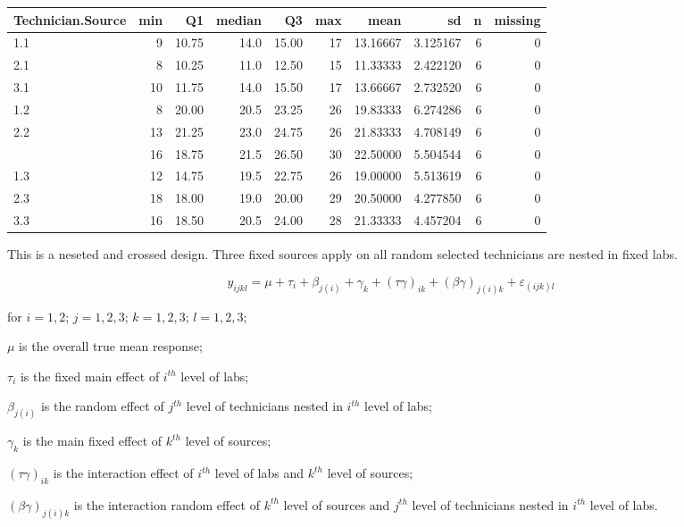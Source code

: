 \documentclass[12pt,]{article}
\begin{document}
\begin{table}[H]
\centering\begingroup\fontsize{8}{10}\selectfont

\begin{tabular}{lrrrrr>{\columncolor[HTML]{EAFAF1}}rrrr}
\toprule
Technician.Source & min & Q1 & median & Q3 & max & mean & sd & n & missing\\
\midrule
1.1 & 9 & 10.75 & 14.0 & 15.00 & 17 & 13.16667 & 3.125167 & 6 & 0\\
2.1 & 8 & 10.25 & 11.0 & 12.50 & 15 & 11.33333 & 2.422120 & 6 & 0\\
3.1 & 10 & 11.75 & 14.0 & 15.50 & 17 & 13.66667 & 2.732520 & 6 & 0\\
1.2 & 8 & 20.00 & 20.5 & 23.25 & 26 & 19.83333 & 6.274286 & 6 & 0\\
2.2 & 13 & 21.25 & 23.0 & 24.75 & 26 & 21.83333 & 4.708149 & 6 & 0\\
\addlinespace
3.2 & 16 & 18.75 & 21.5 & 26.50 & 30 & 22.50000 & 5.504544 & 6 & 0\\
1.3 & 12 & 14.75 & 19.5 & 22.75 & 26 & 19.00000 & 5.513619 & 6 & 0\\
2.3 & 18 & 18.00 & 19.0 & 20.00 & 29 & 20.50000 & 4.277850 & 6 & 0\\
3.3 & 16 & 18.50 & 20.5 & 24.00 & 28 & 21.33333 & 4.457204 & 6 & 0\\
\bottomrule
\end{tabular}
\endgroup{}
\end{table}

This is a neseted and crossed design. Three fixed sources apply on all
random selected technicians are nested in fixed labs.

\[y_{ijkl}=\mu+\tau_i+\beta_{j(i)}+\gamma_{k}+(\tau\gamma)_{ik}+(\beta\gamma)_{j(i)k}+\varepsilon_{(ijk)l}\]

for \(i=1,2\); \(j=1,2,3\); \(k=1,2,3\); \(l=1,2,3\);

\(\mu\) is the overall true mean response;

\(\tau_i\) is the fixed main effect of \(i^{th}\) level of labs;

\(\beta_{j(i)}\) is the random effect of \(j^{th}\) level of technicians
nested in \(i^{th}\) level of labs;

\(\gamma_{k}\) is the main fixed effect of \(k^{th}\) level of sources;

\((\tau\gamma)_{ik}\) is the interaction effect of \(i^{th}\) level of
labs and \(k^{th}\) level of sources;

\((\beta\gamma)_{j(i)k}\) is the interaction random effect of \(k^{th}\)
level of sources and \(j^{th}\) level of technicians nested in
\(i^{th}\) level of labs.
\end{document}
